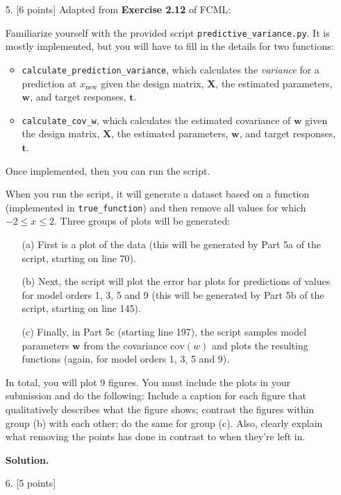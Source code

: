 \documentclass[10pt]{article}
\begin{document}
\begin{itemize}
\item[5.] [6 points]
Adapted from {\bf Exercise 2.12} of FCML:

Familiarize yourself with the provided script {\tt predictive\_variance.py}.  
It is mostly implemented, but you will have to fill in the details for two functions: 
\begin{itemize}
\item {\tt calculate\_prediction\_variance}, which calculates the {\em variance} for a prediction at $x_{\mathrm{new}}$ given the design matrix, $\mathbf{X}$, the estimated parameters, $\mathbf{w}$, and target responses, $\mathbf{t}$.
\item {\tt calculate\_cov\_w}, which calculates the estimated covariance of $\mathbf{w}$ given the design matrix, $\mathbf{X}$, the estimated parameters, $\mathbf{w}$, and target responses, $\mathbf{t}$.
\end{itemize}
Once implemented, then you can run the script.

When you run the script, it will generate a dataset based on a function (implemented in {\tt true\_function}) and then remove all values for which $-2 \leq x \leq 2$.  Three groups of plots will be generated:
\begin{enumerate}
\item[(a)] First is a plot of the data (this will be generated by Part 5a of the script, starting on line 70).  
\item[(b)] Next, the script will plot the error bar plots for predictions of values for model orders 1, 3, 5 and 9 (this will be generated by Part 5b of the script, starting on line 145).  
\item[(c)] Finally, in Part 5c (starting line 197), the script samples model parameters $\mathbf{w}$ from the covariance $\mathrm{cov}(w)$ and plots the resulting functions (again, for model orders 1, 3, 5 and 9).
\end{enumerate}

In total, you will plot 9 figures.  You must include the plots in your submission and do the following: Include a caption for each figure that qualitatively describes what the figure shows; contrast the figures within group (b) with each other; do the same for group (c).  Also, clearly explain what removing the points has done in contrast to when they're left in.

{\bf Solution.}



\item[6.] [5 points]


\end{itemize}
\end{document}
